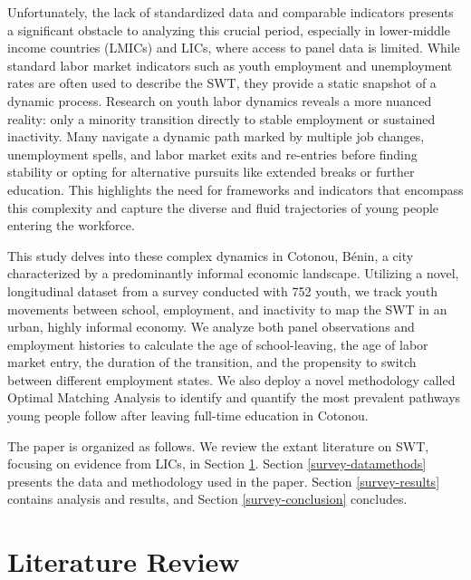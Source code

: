 \documentclass[
  a4paper, twoside, 12pt]{book}
\renewcommand{\hl}[1]{#1}
\begin{document}
\hl{Unfortunately, the lack of standardized data and comparable indicators presents a significant obstacle to analyzing this crucial period, especially in lower-middle income countries (LMICs) and LICs, where access to panel data is limited. While standard labor market indicators such as youth employment and unemployment rates are often used to describe the SWT, they provide a static snapshot of a dynamic process. Research on youth labor dynamics reveals a more nuanced reality: only a minority transition directly to stable employment or sustained inactivity. Many navigate a dynamic path marked by multiple job changes, unemployment spells, and labor market exits and re-entries before finding stability or opting for alternative pursuits like extended breaks or further education. This highlights the need for frameworks and indicators that encompass this complexity and capture the diverse and fluid trajectories of young people entering the workforce.}

\hl{This study delves into these complex dynamics in Cotonou, Bénin, a city characterized by a predominantly informal economic landscape. Utilizing a novel, longitudinal dataset from a survey conducted with 752 youth, we track youth movements between school, employment, and inactivity to map the SWT in an urban, highly informal economy. We analyze both panel observations and employment histories to calculate the age of school-leaving, the age of labor market entry, the duration of the transition, and the propensity to switch between different employment states. We also deploy a novel methodology called Optimal Matching Analysis to identify and quantify the most prevalent pathways young people follow after leaving full-time education in Cotonou.}

The paper is organized as follows. We review the extant literature on SWT, focusing on evidence from LICs, in Section \ref{survey-litreview}. Section \ref{survey-datamethods} presents the data and methodology used in the paper. Section \ref{survey-results} contains analysis and results, and Section \ref{survey-conclusion} concludes.

\hypertarget{survey-litreview}{%
\section{\texorpdfstring{\hl{Literature Review}}{}}\label{survey-litreview}}
\end{document}
